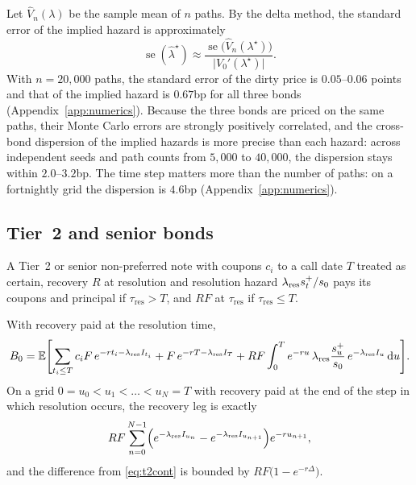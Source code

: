 Let $\hat V_n(\lambda)$ be the sample mean of $n$ paths. By the delta method, the
standard error of the implied hazard is approximately
\begin{equation}\label{eq:sehazard}
  \operatorname{se}(\hat\lambda^\star)\approx\frac{\operatorname{se}\bigl(\hat V_n(\lambda^\star)\bigr)}{\bigl|V_0'(\lambda^\star)\bigr|}.
\end{equation}
With $n=20{,}000$ paths, the standard error of the dirty price is $0.05$--$0.06$ points
and that of the implied hazard is $0.67$bp for all three bonds
(Appendix~\ref{app:numerics}). Because the three bonds are priced on the same paths, their
Monte Carlo errors are strongly positively correlated, and the cross-bond dispersion of
the implied hazards is more precise than each hazard: across independent seeds and path
counts from $5{,}000$ to $40{,}000$, the dispersion stays within $2.0$--$3.2$bp. The time
step matters more than the number of paths: on a fortnightly grid the dispersion is
$4.6$bp (Appendix~\ref{app:numerics}).

\subsection{Tier~2 and senior bonds}\label{sec:t2}

A Tier~2 or senior non-preferred note with coupons $c_i$ to a call date $T$ treated as
certain, recovery $R$ at resolution and resolution hazard $\lambda_{\mathrm{res}} s_t^+/s_0$ pays its
coupons and principal if $\tau_{\mathrm{res}}>T$, and $RF$ at $\tau_{\mathrm{res}}$ if
$\tau_{\mathrm{res}}\le T$.

\begin{proposition}\label{prop:t2}
With recovery paid at the resolution time,
\begin{equation}\label{eq:t2cont}
  B_0=\mathbb{E}\Biggl[\sum_{t_i\le T}c_iF\,e^{-rt_i-\lambda_{\mathrm{res}} I_{t_i}}+F\,e^{-rT-\lambda_{\mathrm{res}} I_T}
  + RF\int_0^Te^{-ru}\,\lambda_{\mathrm{res}}\frac{s_u^+}{s_0}\,e^{-\lambda_{\mathrm{res}} I_u}\,\mathrm{d} u\Biggr].
\end{equation}
On a grid $0=u_0<u_1<\dots<u_N=T$ with recovery paid at the end of the step in which
resolution occurs, the recovery leg is exactly
\begin{equation}\label{eq:t2grid}
  RF\sum_{n=0}^{N-1}\Bigl(e^{-\lambda_{\mathrm{res}} I_{u_n}}-e^{-\lambda_{\mathrm{res}} I_{u_{n+1}}}\Bigr)e^{-ru_{n+1}} ,
\end{equation}
and the difference from \eqref{eq:t2cont} is bounded by $RF\bigl(1-e^{-r\Delta}\bigr)$.
\end{proposition}

